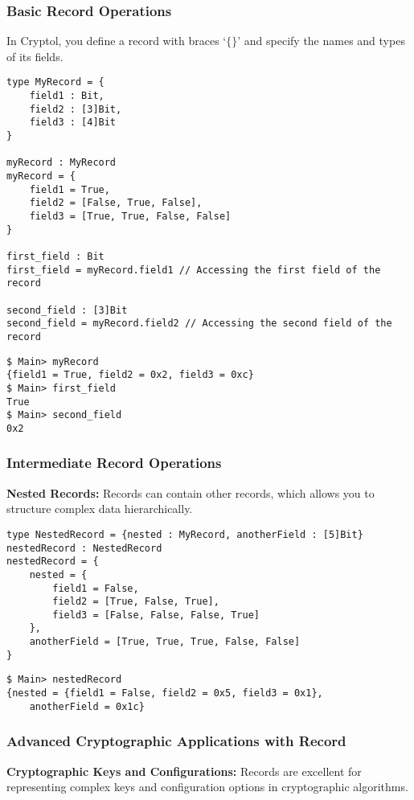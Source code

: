 \subsubsection{Basic Record Operations}
\begin{tcolorbox}[colframe=defcolor,title={\color{white}\bf Record}]
In Cryptol, you define a record with braces `\texttt{$\{\}$}' and specify the names and types of its fields.
\end{tcolorbox}
\begin{lstlisting}[style=cryptol]
type MyRecord = {
	field1 : Bit,
	field2 : [3]Bit,
	field3 : [4]Bit
}

myRecord : MyRecord
myRecord = {
	field1 = True,
	field2 = [False, True, False],
	field3 = [True, True, False, False]
}

first_field : Bit
first_field = myRecord.field1 // Accessing the first field of the record

second_field : [3]Bit
second_field = myRecord.field2 // Accessing the second field of the record
\end{lstlisting}
\begin{lstlisting}[style=zsh]
$ Main> myRecord
{field1 = True, field2 = 0x2, field3 = 0xc}
$ Main> first_field
True
$ Main> second_field
0x2
\end{lstlisting}

\subsubsection{Intermediate Record Operations}
\textbf{Nested Records:} Records can contain other records, which allows you to structure complex data hierarchically.
\begin{lstlisting}[style=cryptol]
type NestedRecord = {nested : MyRecord, anotherField : [5]Bit}
nestedRecord : NestedRecord
nestedRecord = {
	nested = {
		field1 = False,
		field2 = [True, False, True],
		field3 = [False, False, False, True]
	}, 
	anotherField = [True, True, True, False, False]
}
\end{lstlisting}
\begin{lstlisting}[style=zsh]
$ Main> nestedRecord
{nested = {field1 = False, field2 = 0x5, field3 = 0x1},
	anotherField = 0x1c}
\end{lstlisting}

\newpage
\subsubsection{Advanced Cryptographic Applications with Record}
\textbf{Cryptographic Keys and Configurations:} Records are excellent for representing complex keys and configuration options in cryptographic algorithms.

